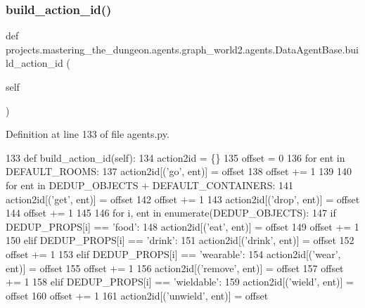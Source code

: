 \subsubsection{\texorpdfstring{build\+\_\+action\+\_\+id()}{build\_action\_id()}}
{\footnotesize\ttfamily def projects.\+mastering\+\_\+the\+\_\+dungeon.\+agents.\+graph\+\_\+world2.\+agents.\+Data\+Agent\+Base.\+build\+\_\+action\+\_\+id (\begin{DoxyParamCaption}\item[{}]{self }\end{DoxyParamCaption})}



Definition at line 133 of file agents.\+py.


\begin{DoxyCode}
133     \textcolor{keyword}{def }build\_action\_id(self):
134         action2id = \{\}
135         offset = 0
136         \textcolor{keywordflow}{for} ent \textcolor{keywordflow}{in} DEFAULT\_ROOMS:
137             action2id[(\textcolor{stringliteral}{'go'}, ent)] = offset
138             offset += 1
139 
140         \textcolor{keywordflow}{for} ent \textcolor{keywordflow}{in} DEDUP\_OBJECTS + DEFAULT\_CONTAINERS:
141             action2id[(\textcolor{stringliteral}{'get'}, ent)] = offset
142             offset += 1
143             action2id[(\textcolor{stringliteral}{'drop'}, ent)] = offset
144             offset += 1
145 
146         \textcolor{keywordflow}{for} i, ent \textcolor{keywordflow}{in} enumerate(DEDUP\_OBJECTS):
147             \textcolor{keywordflow}{if} DEDUP\_PROPS[i] == \textcolor{stringliteral}{'food'}:
148                 action2id[(\textcolor{stringliteral}{'eat'}, ent)] = offset
149                 offset += 1
150             \textcolor{keywordflow}{elif} DEDUP\_PROPS[i] == \textcolor{stringliteral}{'drink'}:
151                 action2id[(\textcolor{stringliteral}{'drink'}, ent)] = offset
152                 offset += 1
153             \textcolor{keywordflow}{elif} DEDUP\_PROPS[i] == \textcolor{stringliteral}{'wearable'}:
154                 action2id[(\textcolor{stringliteral}{'wear'}, ent)] = offset
155                 offset += 1
156                 action2id[(\textcolor{stringliteral}{'remove'}, ent)] = offset
157                 offset += 1
158             \textcolor{keywordflow}{elif} DEDUP\_PROPS[i] == \textcolor{stringliteral}{'wieldable'}:
159                 action2id[(\textcolor{stringliteral}{'wield'}, ent)] = offset
160                 offset += 1
161                 action2id[(\textcolor{stringliteral}{'unwield'}, ent)] = offset

\end{DoxyCode}

